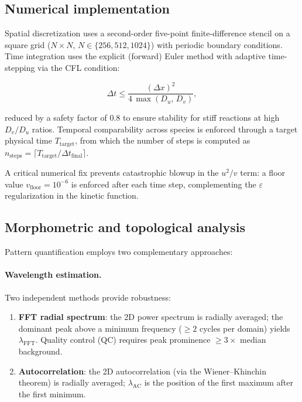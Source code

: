 \documentclass[review,3p]{elsarticle}
\begin{document}
\subsection{Numerical implementation}
\label{sec:numerical}

Spatial discretization uses a second-order five-point finite-difference
stencil on a square grid ($N \times N$, $N \in \{256, 512, 1024\}$)
with periodic boundary conditions. Time integration uses the explicit
(forward) Euler method with adaptive time-stepping via the CFL
condition:

\begin{equation}
\label{eq:cfl}
  \Delta t \leq \frac{(\Delta x)^2}{4\,\max(D_u,\, D_v)},
\end{equation}

\noindent reduced by a safety factor of $0.8$ to ensure stability for
stiff reactions at high $D_v/D_u$ ratios. Temporal comparability
across species is enforced through a target physical time $T_\text{target}$,
from which the number of steps is computed as
$n_\text{steps} = \lceil T_\text{target} / \Delta t_\text{final}\rceil$.

A critical numerical fix prevents catastrophic blowup in the
$u^2 / v$ term: a floor value $v_\text{floor} = 10^{-6}$ is enforced
after each time step, complementing the $\varepsilon$ regularization
in the kinetic function.

\subsection{Morphometric and topological analysis}
\label{sec:analysis}

Pattern quantification employs two complementary approaches:

\paragraph{Wavelength estimation.}
Two independent methods provide robustness:
\begin{enumerate}
  \item \textbf{FFT radial spectrum}: the 2D power spectrum is
    radially averaged; the dominant peak above a minimum frequency
    ($\geq 2$ cycles per domain) yields $\lambda_\text{FFT}$.
    Quality control (QC) requires peak prominence
    $\geq 3\times$ median background.
  \item \textbf{Autocorrelation}: the 2D autocorrelation (via the
    Wiener--Khinchin theorem) is radially averaged; $\lambda_\text{AC}$
    is the position of the first maximum after the first minimum.
\end{enumerate}
\end{document}
